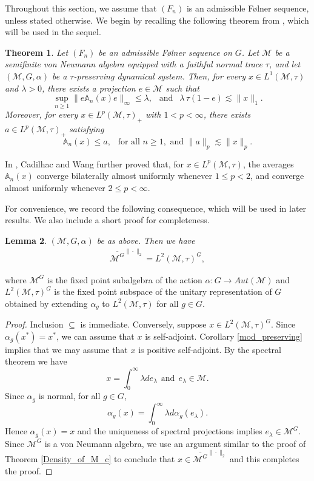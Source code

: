 \documentclass[11pt]{amsart}
\newtheorem{thm}{Theorem}[section]
\newtheorem{lem}[thm]{Lemma}
\theoremstyle{definition}
\theoremstyle{myremark}
\numberwithin{equation}{section}
\def\A{\mathbb A}
\newcommand{\CM}{\mathcal{M}}
\begin{document}
\medskip
\noindent
Throughout this section, we assume that $(F_n)$ is an admissible F\o lner sequence, unless stated otherwise. We begin by recalling the following theorem from \cite{cadilhac2022noncommutative}, which will be used in the sequel.
\begin{thm}\label{Cadilac-Wang}
Let $(F_n)$ be an admissible F\o lner sequence on $G$. Let $\CM$ be a semifinite von Neumann algebra equipped with a faithful normal trace $\tau$, and let $(\CM,G,\alpha)$ be a $\tau$-preserving dynamical system. Then, for every $x\in L^1(\CM,\tau)$ and $\lambda>0$, there exists a projection $e\in \CM$ such that
\[
\sup_{n\geq 1}\|e\A_n(x)e\|_\infty \leq \lambda, ~~
 \text{  and   } ~~
\lambda\,\tau(1-e)\lesssim \|x\|_1.
\]
Moreover, for every $x\in L^p(\CM,\tau)_+$ with $1<p<\infty$, there exists $a\in L^p(\CM,\tau)_+$ satisfying
\[
\A_n(x)\leq a,~~ \text{ for all } n\geq 1, \text{  and  } \|a\|_p \lesssim \|x\|_p.
\]
\end{thm}
In \cite{cadilhac_noncommutative_2019}, Cadilhac and Wang further proved that, for $x\in L^p(\CM,\tau)$, the averages $\A_n(x)$ converge bilaterally almost uniformly whenever $1\leq p<2$, and converge almost uniformly whenever $2\leq p<\infty$.

For convenience, we record the following consequence, which will be used in later results. We also include a short proof for completeness.

\begin{lem}\label{Fix_point_density}
  $(\CM, G,\alpha)$ be as above. Then we have 
  \begin{align*}
      \overline{\CM^G}^{\|\cdot\|_2} = L^2(\CM,\tau)^G,
  \end{align*}
\end{lem}
\noindent where $\CM^{G}$ is the fixed point subalgebra of the action $\alpha:G \rightarrow Aut(\CM)$ and $L^{2}(\CM,\tau)^{G}$ is the fixed point subspace of the unitary representation of $G$ obtained by extending $\alpha_{g}$ to $L^{2}(\CM,\tau)$ for all $g \in G$.
\begin{proof}
Inclusion $\subseteq$ is immediate. Conversely, suppose $x \in L^2(\CM, \tau)^G$. Since $\alpha_g(x^*)=x^*$, we can assume that $x$ is self-adjoint. Corollary \ref{mod_preserving} implies that we may assume that $x$ is positive self-adjoint. By the spectral theorem we have $$x=\int_0^\infty \lambda de_\lambda ~~ \text{and} ~~ e_\lambda \in \CM.$$
   Since $\alpha_g$ is normal, for all $g \in G$,
   $$\alpha_g(x)=\int_0^\infty \lambda d \alpha_g (e_\lambda).$$
  Hence $\alpha_g(x)=x$ and the uniqueness of spectral projections implies $e_\lambda \in \CM^G$. Since $\CM^G$ is a von Neumann algebra, we use an argument similar to the proof of Theorem \ref{Density_of_M_c} to conclude that $x \in \overline{\CM^G}^{\|\cdot\|_2}$ and this completes the proof.    
\end{proof}
\end{document}
